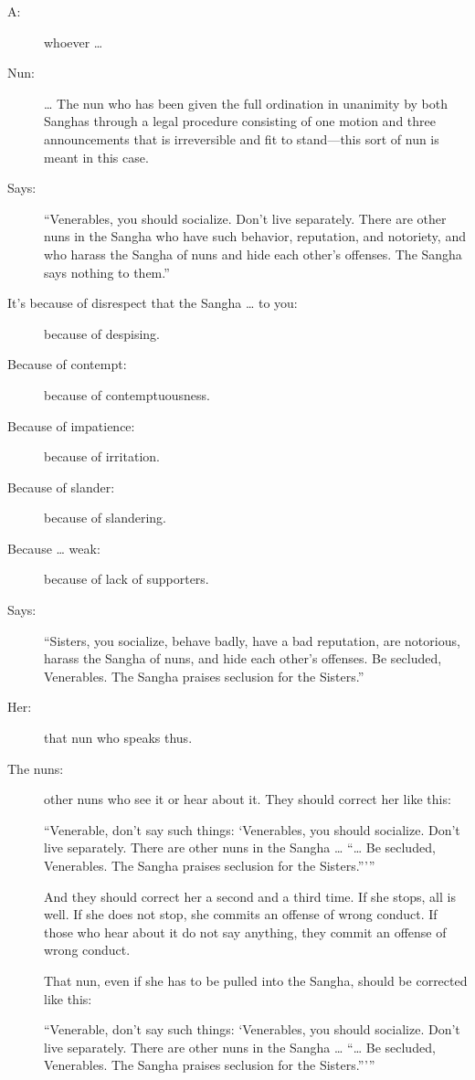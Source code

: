\documentclass[12pt,openany]{book}%
\begin{document}
\begin{description}%
\item[A: ] whoever … %
\item[Nun: ] … The nun who has been given the full ordination in unanimity by both Sanghas through a legal procedure consisting of one motion and three announcements that is irreversible and fit to stand—this sort of nun is meant in this case. %
\item[Says: ] “Venerables, you should socialize. Don’t live separately. There are other nuns in the Sangha who have such behavior, reputation, and notoriety, and who harass the Sangha of nuns and hide each other’s offenses. The Sangha says nothing to them.” %
\item[It’s because of disrespect that the Sangha … to you: ] because of despising. %
\item[Because of contempt: ] because of contemptuousness. %
\item[Because of impatience: ] because of irritation. %
\item[Because of slander: ] because of slandering. %
\item[Because … weak: ] because of lack of supporters. %
\item[Says: ] “Sisters, you socialize, behave badly, have a bad reputation, are notorious, harass the Sangha of nuns, and hide each other’s offenses. Be secluded, Venerables. The Sangha praises seclusion for the Sisters.” %
\item[Her: ] that nun who speaks thus. %
\item[The nuns: ] other nuns who see it or hear about it. They should correct her like this: 

“Venerable, don’t say such things: ‘Venerables, you should socialize. Don’t live separately. There are other nuns in the Sangha … “… Be secluded, Venerables. The Sangha praises seclusion for the Sisters.”’” 

And they should correct her a second and a third time. If she stops, all is well. If she does not stop, she commits an offense of wrong conduct. If those who hear about it do not say anything, they commit an offense of wrong conduct. 

That nun, even if she has to be pulled into the Sangha, should be corrected like this: 

“Venerable, don’t say such things: ‘Venerables, you should socialize. Don’t live separately. There are other nuns in the Sangha … “… Be secluded, Venerables. The Sangha praises seclusion for the Sisters.”’” 


\end{description}
\end{document}
